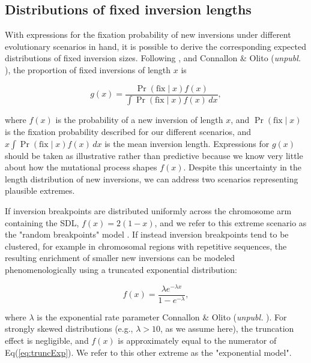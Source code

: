 \documentclass{article}
\newcommand\hl[1]{%
  \bgroup
  \hskip0pt\color{blue!80!black}%
  #1%
  \egroup
}
\begin{document}
\bigskip
\subsection*{Distributions of fixed inversion lengths} \label{subsec:DistFixedInv}

With expressions for the fixation probability of new inversions under different evolutionary scenarios in hand, it is possible to derive the corresponding expected distributions of fixed inversion sizes. Following \citet{vanValenLevins1968, Santos1986}, and \hl{Connallon \& Olito ({\itshape unpubl.}}), the proportion of fixed inversions of length $x$ is 

\begin{equation} \label{eq:generalInvSizeModel}
	g(x) = \frac{\Pr(\text{fix} \mid x) f(x)} {\int \Pr(\text{fix} \mid x) f(x)\,dx},
\end{equation}

\noindent where $f(x)$ is the probability of a new inversion of length $x$, and $\Pr(\text{fix} \mid x)$ is the fixation probability described for our different scenarios, and $x\int \Pr(\text{fix} \mid x) f(x)\,dx$ is the mean inversion length. Expressions for $g(x)$ should be taken as illustrative rather than predictive because we know very little about how the mutational process shapes $f(x)$. Despite this uncertainty in the length distribution of new inversions, we can address two scenarios representing plausible extremes.

If inversion breakpoints are distributed uniformly across the chromosome arm containing the SDL, $f(x) = 2(1 - x)$, and we refer to this extreme scenario as the "random breakpoints" model \citep{vanValenLevins1968}. If instead inversion breakpoints tend to be clustered, for example in chromosomal regions with repetitive sequences, the resulting enrichment of smaller new inversions can be modeled phenomenologically using a truncated exponential distribution:

\begin{equation} \label{eq:truncExp}
	f(x) = \frac{ \lambda e^{-\lambda x}} {1 - e^{-\lambda}},
\end{equation}

\noindent where $\lambda$ is the exponential rate parameter \hl{Connallon \& Olito ({\itshape unpubl.}}). For strongly skewed distributions (e.g., $\lambda > 10$, as we assume here), the truncation effect is negligible, and $f(x)$ is approximately equal to the numerator of Eq(\ref{eq:truncExp}). We refer to this other extreme as the "exponential model".
\end{document}
